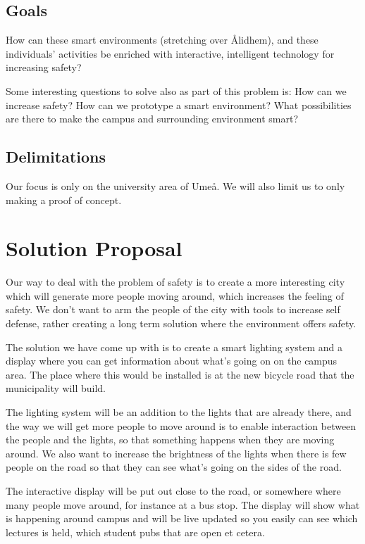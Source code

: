 \documentclass[twoside]{report}
\begin{document}
\subsection{Goals}
How can these smart environments (stretching over Ålidhem), and these
individuals’ activities be enriched with interactive, intelligent technology
for increasing safety?

Some interesting questions to solve also as part of this problem is: How can we
increase safety? How can we prototype a smart environment? What possibilities
are there to make the campus and surrounding environment smart? 

\subsection{Delimitations}
Our focus is only on the university area of Umeå. We will also limit us to only making a proof of concept.

\newpage

\section{Solution Proposal}
Our way to deal with the problem of safety is to create a more interesting city
which will generate more people moving around, which increases the feeling of
safety. We don’t want to arm the people of the city with tools to increase self
defense, rather creating a long term solution where the environment offers
safety. 

The solution we have come up with is to create a smart lighting system and a
display where you can get information about what’s going on on the campus area.
The place where this would be installed is at the new bicycle road that the
municipality will build. 

The lighting system will be an addition to the lights that are already there,
and the way we will get more people to move around is to enable interaction
between the people and the lights, so that something happens when they are
moving around. We also want to increase the brightness of the lights when there
is few people on the road so that they can see what’s going on the sides of the
road. 

The interactive display will be put out close to the road, or somewhere where
many people move around, for instance at a bus stop. The display will show what
is happening around campus and will be live updated so you easily can see which
lectures is held, which student pubs that are open et cetera. 
\end{document}
